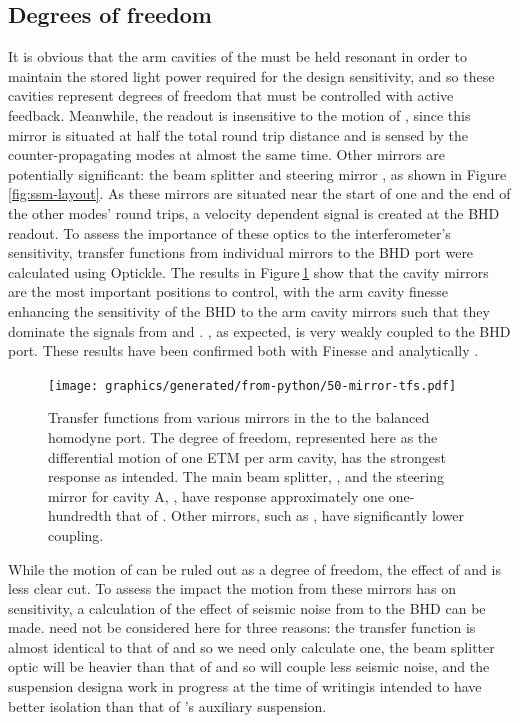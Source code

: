 \subsection{\label{sec:ssm-dofs}Degrees of freedom}
It is obvious that the arm cavities of the \SSM{} must be held resonant in order to maintain the  stored light power required for the design sensitivity, and so these cavities represent degrees of freedom that must be controlled with active feedback. Meanwhile, the readout is insensitive to the motion of \MINT{}, since this mirror is situated at half the total round trip distance and is sensed by the counter-propagating modes at almost the same time. Other mirrors are potentially significant: the beam splitter \MSIX{} and steering mirror \MSEVEN{}, as shown in Figure\,\ref{fig:ssm-layout}. As these mirrors are situated near the start of one and the end of the other modes' round trips, a velocity dependent signal is created at the \gls{BHD} readout. To assess the importance of these optics to the interferometer's \LMINUS{} sensitivity, transfer functions from individual mirrors to the \gls{BHD} port were calculated using Optickle. The results in Figure\,\ref{fig:ssm-mirror-tfs} show that the cavity mirrors are the most important positions to control, with the arm cavity finesse enhancing the sensitivity of the \gls{BHD} to the arm cavity mirrors such that they dominate the signals from \MSIX{} and \MSEVEN{}. \MINT{}, as expected, is very weakly coupled to the \gls{BHD} port. These results have been confirmed both with Finesse and analytically \cite{Graefke2015}.

\begin{figure}
  \centering
  \texttt{[image: graphics/generated/from-python/50-mirror-tfs.pdf]}
  \caption[Transfer functions from various mirrors in the \SSMEXPT{} to the balanced homodyne port]{\label{fig:ssm-mirror-tfs}Transfer functions from various mirrors in the \SSMEXPT{} to the balanced homodyne port. The \LMINUS{} degree of freedom, represented here as the differential motion of one ETM per arm cavity, has the strongest response as intended. The main beam splitter, \MSIX{}, and the steering mirror for cavity A, \MSEVEN{}, have response approximately one one-hundredth that of \LMINUS{}. Other mirrors, such as \MINT{}, have significantly lower coupling.}
\end{figure}

While the motion of \MINT{} can be ruled out as a degree of freedom, the effect of \MSIX{} and \MSEVEN{} is less clear cut. To assess the impact the motion from these mirrors has on \LMINUS{} sensitivity, a calculation of the effect of seismic noise from \MSEVEN{} to the \gls{BHD} can be made. \MSIX{} need not be considered here for three reasons: the transfer function is almost identical to that of \MSEVEN{} and so we need only calculate one, the beam splitter optic will be heavier than that of \MSEVEN{} and so will couple less seismic noise, and the suspension design\textemdash a work in progress at the time of writing\textemdash is intended to have better isolation than that of \MSEVEN{}'s auxiliary suspension.

